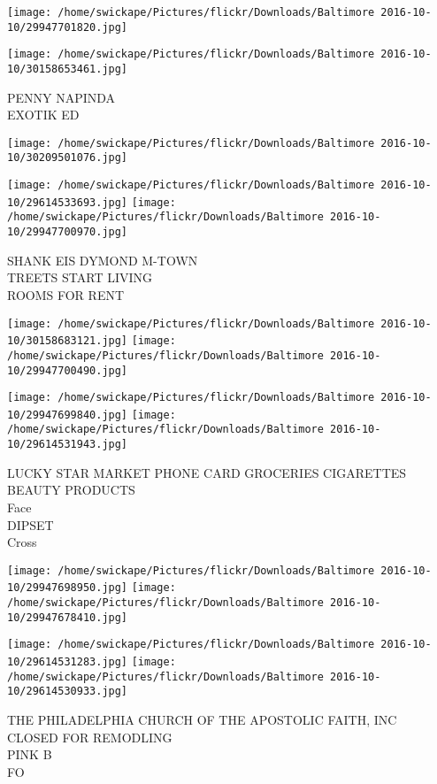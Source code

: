 \documentclass[10pt,letterpaper]{article}
\begin{document}
\texttt{[image: /home/swickape/Pictures/flickr/Downloads/Baltimore 2016-10-10/29947701820.jpg]}

\vspace{0.25in}
\texttt{[image: /home/swickape/Pictures/flickr/Downloads/Baltimore 2016-10-10/30158653461.jpg]}

PENNY NAPINDA\\
EXOTIK ED
\pagebreak

\texttt{[image: /home/swickape/Pictures/flickr/Downloads/Baltimore 2016-10-10/30209501076.jpg]}

\vspace{0.25in}
\texttt{[image: /home/swickape/Pictures/flickr/Downloads/Baltimore 2016-10-10/29614533693.jpg]}
\texttt{[image: /home/swickape/Pictures/flickr/Downloads/Baltimore 2016-10-10/29947700970.jpg]}

SHANK EIS DYMOND M{-}TOWN\\
TREETS START LIVING\\
ROOMS FOR RENT
\pagebreak

\texttt{[image: /home/swickape/Pictures/flickr/Downloads/Baltimore 2016-10-10/30158683121.jpg]}
\texttt{[image: /home/swickape/Pictures/flickr/Downloads/Baltimore 2016-10-10/29947700490.jpg]}

\texttt{[image: /home/swickape/Pictures/flickr/Downloads/Baltimore 2016-10-10/29947699840.jpg]}
\texttt{[image: /home/swickape/Pictures/flickr/Downloads/Baltimore 2016-10-10/29614531943.jpg]}

LUCKY STAR MARKET PHONE CARD GROCERIES CIGARETTES BEAUTY PRODUCTS\\
Face\\
DIPSET\\
Cross
\pagebreak

\texttt{[image: /home/swickape/Pictures/flickr/Downloads/Baltimore 2016-10-10/29947698950.jpg]}
\texttt{[image: /home/swickape/Pictures/flickr/Downloads/Baltimore 2016-10-10/29947678410.jpg]}

\texttt{[image: /home/swickape/Pictures/flickr/Downloads/Baltimore 2016-10-10/29614531283.jpg]}
\texttt{[image: /home/swickape/Pictures/flickr/Downloads/Baltimore 2016-10-10/29614530933.jpg]}

THE PHILADELPHIA CHURCH OF THE APOSTOLIC FAITH, INC\\
CLOSED FOR REMODLING\\
PINK B\\
FO
\pagebreak
\end{document}
